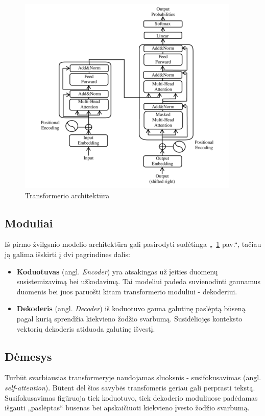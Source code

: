 \documentclass[conference]{IEEEtran}
\begin{document}
\begin{figure}
    \centering
    \includegraphics[scale=0.65]{transformer.png}
    \caption{Transformerio architektūra}
    \label{pav:1}
\end{figure}

\subsection{Moduliai}
Iš pirmo žvilgsnio modelio architektūra gali pasirodyti sudėtinga „~\ref{pav:1} pav.“, tačiau ją galima išskirti į dvi pagrindines dalis:
\begin{itemize}
  \item \textbf{Koduotuvas} (angl. \textit{Encoder}) yra atsakingas už įeities duomenų susistemizavimą bei užkodavimą. Tai modeliui padeda suvienodinti gaunamus duomenis bei juos paruošti kitam transformerio moduliui - dekoderiui.
  \item \textbf{Dekoderis} (angl. \textit{Decoder}) iš koduotuvo gauna galutinę paslėptą būseną pagal kurią sprendžia kiekvieno žodžio svarbumą. Susidėliojęs konteksto vektorių dekoderis atiduoda galutinę išvestį.
\end{itemize}
\subsection{Dėmesys}
Turbūt svarbiausias transformeryje naudojamas sluoksnis - susifokusavimas (angl. \textit{self-attention}). Būtent dėl šios savybės transfomeris geriau gali perprasti tekstą. Susifokusavimas figūruoja tiek koduotuvo, tiek dekoderio moduliuose padėdamas išgauti „paslėptas“ būsenas bei apskaičiuoti kiekvieno įvesto žodžio svarbumą. 
\end{document}
